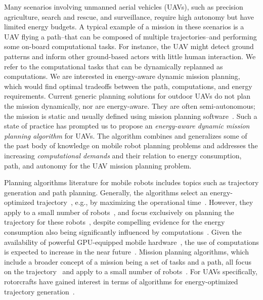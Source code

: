\documentclass[letterpaper,10pt,conference]{ieeeconf}
\theoremstyle{definition}
\begin{document}
Many scenarios involving unmanned aerial vehicles (UAVs), such as precision agriculture, search and rescue, and surveillance, require high autonomy but have limited energy budgets. A typical example of a mission in these scenarios is a UAV flying a path--that can be composed of multiple trajectories--and performing some on-board computational tasks. For instance, the UAV might detect ground patterns and inform other ground-based actors with little human interaction. We refer to the computational tasks that can be dynamically replanned as computations. We are interested in energy-aware dynamic mission planning, which would find optimal tradeoffs between the path, computations, and energy requirements. Current generic planning solutions for outdoor UAVs do not plan the mission dynamically, nor are energy-aware. They are often semi-autonomous; the mission is static and usually defined using mission planning software~\cite{daponte2019review}. Such a state of practice has prompted us to propose an \emph{energy-aware dynamic mission planning algorithm} for UAVs. The algorithm combines and generalizes some of the past body of knowledge on mobile robot planning problems and addresses the increasing \emph{computational demands} and their relation to energy consumption, path, and autonomy for the UAV mission planning problem.

Planning algorithms literature for mobile robots includes topics such as trajectory generation and path planning. Generally, the algorithms select an energy-optimized trajectory~\cite{mei2004energy}, e.g., by maximizing the operational time~\cite{wahab2015energy}. However, they apply to a small number of robots~\cite{kim2005energy}, and focus exclusively on planning the trajectory for these robots~\cite{kim2008minimum}, despite compelling evidence for the energy consumption also being significantly influenced by computations~\cite{mei2005case}. Given the availability of powerful GPU-equipped mobile hardware~\cite{rizvi2017general}, the use of computations is expected to increase in the near future~\cite{abramov2012real,satria2016real,jaramillo2019visual}. Mission planning algorithms, which include a broader concept of a mission being a set of tasks and a path, all focus on the trajectory~\cite{mei2005case,mei2006deployment} and apply to a small number of robots~\cite{sadrpour2013mission,sadrpour2013experimental}. For UAVs specifically, rotorcrafts have gained interest in terms of algorithms for energy-optimized trajectory generation~\cite{morbidi2016minimum,kreciglowa2017energy}. 
\end{document}
